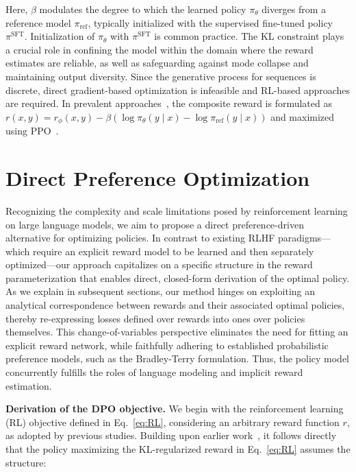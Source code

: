 Here, $\beta$ modulates the degree to which the learned policy $\pi_\theta$ diverges from a reference model $\pi_\text{ref}$, typically initialized with the supervised fine-tuned policy $\pi^\text{SFT}$. Initialization of $\pi_\theta$ with $\pi^\text{SFT}$ is common practice. The KL constraint plays a crucial role in confining the model within the domain where the reward estimates are reliable, as well as safeguarding against mode collapse and maintaining output diversity. Since the generative process for sequences is discrete, direct gradient-based optimization is infeasible and RL-based approaches are required. In prevalent approaches~\citep{ziegler2020finetuning, stiennon2022learning, bai2022training, ouyang2022training}, the composite reward is formulated as ${r(x, y) = r_{\phi}(x, y) -\beta (\log \pi_{\theta}(y\mid x) - \log \pi_\text{ref}(y\mid x))}$ and maximized using PPO~\cite{schulman2017proximal}.

\section{Direct Preference Optimization}\label{sec:DPO}

Recognizing the complexity and scale limitations posed by reinforcement learning on large language models, we aim to propose a direct preference-driven alternative for optimizing policies. In contrast to existing RLHF paradigms—which require an explicit reward model to be learned and then separately optimized—our approach capitalizes on a specific structure in the reward parameterization that enables direct, closed-form derivation of the optimal policy. As we explain in subsequent sections, our method hinges on exploiting an analytical correspondence between rewards and their associated optimal policies, thereby re-expressing losses defined over rewards into ones over policies themselves. This change-of-variables perspective eliminates the need for fitting an explicit reward network, while faithfully adhering to established probabilistic preference models, such as the Bradley-Terry formulation. Thus, the policy model concurrently fulfills the roles of language modeling and implicit reward estimation.

\textbf{Derivation of the DPO objective.} We begin with the reinforcement learning (RL) objective defined in Eq.~\ref{eq:RL}, considering an arbitrary reward function $r$, as adopted by previous studies. Building upon earlier work~\citep{peters2007reinforcement, peng2019advantage, korbak2022reinforcement, go2023aligning}, it follows directly that the policy maximizing the KL-regularized reward in Eq.~\ref{eq:RL} assumes the structure:

